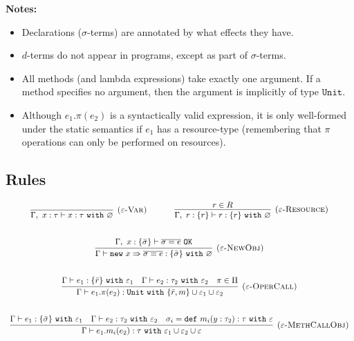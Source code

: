 \documentclass{llncs}
\newcommand{\keywadj}[1]{\mathtt{#1}}
\newcommand{\keyw}[1]{\keywadj{#1}~}
\begin{document}
\noindent \textbf{Notes:}

\begin{itemize}
	\item Declarations ($\sigma$-terms) are annotated by what effects they have.
	\item $d$-terms do not appear in programs, except as part of $\sigma$-terms.
	\item All methods (and lambda expressions) take exactly one argument. If a method specifies no argument, then the argument is implicitly of type $\keywadj{Unit}$.
	\item Although $e_1.\pi(e_2)$ is a syntactically valid expression, it is only well-formed under the static semantics if $e_1$ has a resource-type (remembering that $\pi$ operations can only be performed on resources). 
\end{itemize}

\subsection{Rules}

\fbox{$\Gamma \vdash e : \tau~\keyw{with} \varepsilon$}

\[
\begin{array}{c}
\infer[\textsc{($\varepsilon$-Var)}]
  {\Gamma,~x:\tau \vdash x:\tau~ \keyw{with} \varnothing}
  {} 
~~~~~~~~~~
\infer[\textsc{($\varepsilon$-Resource)}]
  {\Gamma,~r :\{r\} \vdash r:\{ r \} ~ \keyw{with} \varnothing}
  {r \in R} \\[5ex]

\infer[\textsc{($\varepsilon$-NewObj)}]
	{\Gamma \vdash \keywadj{new}~x \Rightarrow \overline{\sigma = e} : \{ \bar \sigma \}~\keyw{with} \varnothing}
	{\Gamma,~x : \{ \bar \sigma \} \vdash \overline{\sigma = e}~\keywadj{OK}} \\[5ex]

\infer[\textsc{($\varepsilon$-OperCall)}]
	{\Gamma \vdash e_1.\pi(e_2) : \keyw{Unit} \keyw{with} \{ \bar r, m\} \cup \varepsilon_1 \cup \varepsilon_2}
	{\Gamma \vdash e_1 : \{ \bar r \}~ \keyw{with} \varepsilon_1 & \Gamma \vdash e_2:\tau_2~\keyw{with} \varepsilon_2 & \pi \in \Pi} \\[5ex]
	
\infer[\textsc{($\varepsilon$-MethCallObj)}]
	{\Gamma \vdash e_1.m_i(e_2):\tau~\keyw{with} \varepsilon_1 \cup \varepsilon_2 \cup \varepsilon}
	{\Gamma \vdash e_1 : \{ \bar \sigma \}~\keyw{with} \varepsilon_1 & \Gamma \vdash e_2 : \tau_2~\keyw{with} \varepsilon_2 & \sigma_i = \keyw{def} m_i(y:\tau_2):\tau~\keyw{with} \varepsilon}

\end{array}
\]
\end{document}
